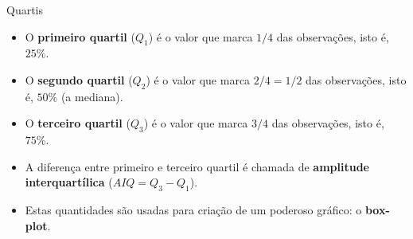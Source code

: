 \documentclass[
  ignorenonframetext,
  serif,
  professionalfont,
  usenames,
  dvipsnames,
  aspectratio = 169]{beamer}
\providecommand{\tightlist}{%
  \setlength{\itemsep}{0pt}\setlength{\parskip}{0pt}}
\renewcommand{\tightlist}{%
  \setlength{\itemsep}{0\baselineskip}
  \setlength{\parskip}{0.25\baselineskip}
}
\begin{document}
\begin{frame}{Quartis}
\label{quartis-1}
\begin{itemize}
\tightlist
\item
  O \textbf{primeiro quartil} (\(Q_1\)) é o valor que marca \(1/4\) das
  observações, isto é, \(25\%\).
\end{itemize}

\vspace{0.3cm}

\begin{itemize}
\tightlist
\item
  O \textbf{segundo quartil} (\(Q_2\)) é o valor que marca \(2/4=1/2\)
  das observações, isto é, \(50\%\) (a mediana).
\end{itemize}

\vspace{0.3cm}

\begin{itemize}
\tightlist
\item
  O \textbf{terceiro quartil} (\(Q_3\)) é o valor que marca \(3/4\) das
  observações, isto é, \(75\%\).
\end{itemize}

\vspace{0.3cm}

\begin{itemize}
\tightlist
\item
  A diferença entre primeiro e terceiro quartil é chamada de
  \textbf{amplitude interquartílica} (\(AIQ = Q_3-Q_1\)).
\end{itemize}

\vspace{0.3cm}

\begin{itemize}
\tightlist
\item
  Estas quantidades são usadas para criação de um poderoso gráfico: o
  \textbf{box-plot}.
\end{itemize}
\end{frame}
\end{document}
